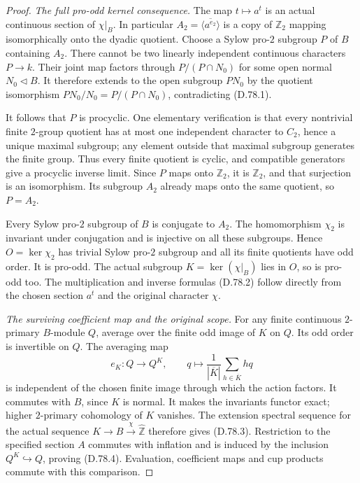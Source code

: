 \begin{proof}
\emph{The full pro-odd kernel consequence.}
The map $t\mapsto a^t$ is an actual continuous section of $\chi|_B$.
In particular $A_2=\overline{\langle a^{e_2}\rangle}$ is a copy of
$\mathbb Z_2$ mapping isomorphically onto the dyadic quotient. Choose a
Sylow pro-$2$ subgroup $P$ of $B$ containing $A_2$.
There cannot be two linearly independent continuous characters
$P\to k$. Their joint map factors through $P/(P\cap N_0)$ for some
open normal $N_0\triangleleft B$. It therefore extends to the open
subgroup $PN_0$ by the quotient isomorphism
$PN_0/N_0=P/(P\cap N_0)$, contradicting (D.78.1).

It follows that $P$ is procyclic. One elementary verification is that
every nontrivial finite $2$-group quotient has at most one independent
character to $C_2$, hence a unique maximal subgroup; any element outside
that maximal subgroup generates the finite group. Thus every finite
quotient is cyclic, and compatible generators give a procyclic inverse
limit. Since $P$ maps onto $\mathbb Z_2$, it is $\mathbb Z_2$, and that
surjection is an isomorphism. Its subgroup $A_2$ already maps onto the
same quotient, so $P=A_2$.

Every Sylow pro-$2$ subgroup of $B$ is conjugate to $A_2$.
The homomorphism $\chi_2$ is invariant under conjugation and is injective
on all these subgroups. Hence $O=\ker\chi_2$ has trivial Sylow pro-$2$
subgroup and all its finite quotients have odd order. It is pro-odd.
The actual subgroup $K=\ker(\chi|_B)$ lies in $O$, so is pro-odd too.
The multiplication and inverse formulas (D.78.2) follow directly from
the chosen section $a^t$ and the original character $\chi$.

\emph{The surviving coefficient map and the original scope.}
For any finite continuous $2$-primary $B$-module $Q$, average over the
finite odd image of $K$ on $Q$. Its odd order is invertible on $Q$. The averaging map
\[
       e_K:Q\longrightarrow Q^K,
       \qquad q\longmapsto\frac1{|\overline K|}
                               \sum_{h\in\overline K}hq       \tag{D.78.20}
\]
is independent of the chosen finite image through which the action
factors. It commutes with $B$, since $K$ is normal. It makes the
invariants functor exact; higher $2$-primary cohomology of $K$ vanishes.
The extension spectral sequence for the actual sequence
$K\to B\xrightarrow{\chi}\widehat{\mathbb Z}$ therefore gives (D.78.3).
Restriction to the specified section $A$ commutes with inflation and
is induced by the inclusion $Q^K\hookrightarrow Q$, proving (D.78.4).
Evaluation, coefficient maps and cup products commute with this comparison.


\end{proof}
